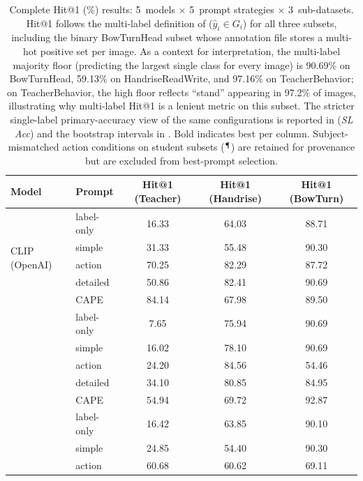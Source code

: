 \documentclass[symmetry,article,submit,pdftex,moreauthors]{Definitions/mdpi}
\begin{document}
\begin{table}[H]
\caption{Complete Hit@1 (\%) results: 5~models $\times$ 5~prompt strategies $\times$ 3~sub-datasets. Hit@1 follows the multi-label definition of  ($\hat{y}_i \in G_i$) for all three subsets, including the binary BowTurnHead subset whose annotation file stores a multi-hot positive set per image. As a context for interpretation, the multi-label majority floor (predicting the largest single class for every image) is 90.69\% on BowTurnHead, 59.13\% on HandriseReadWrite, and 97.16\% on TeacherBehavior; on TeacherBehavior, the high floor reflects ``stand'' appearing in 97.2\% of images, illustrating why multi-label Hit@1 is a lenient metric on this subset. The stricter single-label primary-accuracy view of the same configurations is reported in  (\textit{SL Acc}) and the bootstrap intervals in . Bold indicates best per column. Subject-mismatched action conditions on student subsets ($^{\mathparagraph}$) are retained for provenance but are excluded from best-prompt selection.}
\label{tab:main_results}
\centering
\small
\setlength{\tabcolsep}{4pt}
\begin{tabular}{ll ccc}
\toprule
\textbf{Model} & \textbf{Prompt} & \textbf{Hit@1 (Teacher)} & \textbf{Hit@1 (Handrise)} & \textbf{Hit@1 (BowTurn)} \\
\midrule
\multirow{5}{*}{CLIP (OpenAI)}
 & label-only & 16.33 & 64.03 & 88.71 \\
 & simple & 31.33 & 55.48 & 90.30 \\
 & action & 70.25 & 82.29 & 87.72 \\
 & detailed & 50.86 & 82.41 & 90.69 \\
 & CAPE & 84.14 & 67.98 & 89.50 \\
\addlinespace
\multirow{5}{*}{OpenCLIP (LAION)}
 & label-only & 7.65 & 75.94 & 90.69 \\
 & simple & 16.02 & 78.10 & 90.69 \\
 & action & 24.20 & 84.56\rlap{$^{\mathparagraph}$} & 54.46\rlap{$^{\ddagger}$} \\
 & detailed & 34.10 & 80.85 & 84.95 \\
 & CAPE & 54.94 & 69.72 & 92.87 \\
\addlinespace
\multirow{5}{*}{SigLIP2}
 & label-only & 16.42\rlap{$^{\S}$} & 63.85 & 90.10 \\
 & simple & 24.85 & 54.40 & 90.30 \\
 & action & 60.68 & 60.62 & 69.11 \\

\end{tabular}
\end{table}
\end{document}

